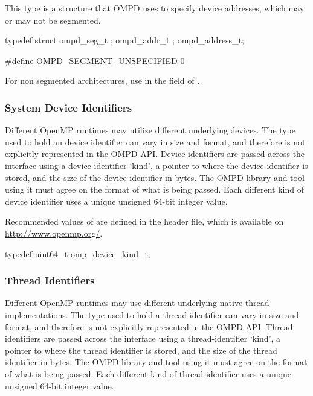 This type is a structure that OMPD uses to specify device addresses, 
which may or may not be segmented.

\format

\begin{ccppspecific}
\begin{ompEnv}
typedef struct {
  ompd_seg_t ;
  ompd_addr_t ;
} ompd_address_t;

#define OMPD_SEGMENT_UNSPECIFIED 0
\end{ompEnv}
\end{ccppspecific}


For non segmented architectures, use  in the  
field of .

\subsubsection{System Device Identifiers}

Different OpenMP runtimes may utilize different underlying devices.
The type used to hold an device identifier can vary in size and format, and 
therefore is not explicitly represented in the OMPD API. Device identifiers are 
passed across the interface using a device-identifier `kind', a pointer to where
the device identifier is stored, and the size of the device identifier in bytes.
The OMPD library and tool using it must agree on the format
of what is being passed.
Each different kind of device identifier uses a unique
unsigned 64-bit integer value.

Recommended values of  are defined in the  
header file, which is available on \url{http://www.openmp.org/}. 

\label{ompd:omp_device_kind_t}
\format

\begin{ccppspecific}
\begin{ompSyntax}
typedef uint64_t omp_device_kind_t;
\end{ompSyntax}
\end{ccppspecific}


\subsubsection{Thread Identifiers}

Different OpenMP runtimes may use different underlying native
thread implementations.
The type used to hold a thread identifier can vary in size and format, and 
therefore is not explicitly represented in the OMPD API. Thread identifiers are 
passed across the interface using a thread-identifier `kind', a pointer to where
the thread identifier is stored, and the size of the thread identifier in bytes.
The OMPD library and tool using it must agree on the format
of what is being passed.
Each different kind of thread identifier uses a unique
unsigned 64-bit integer value.

